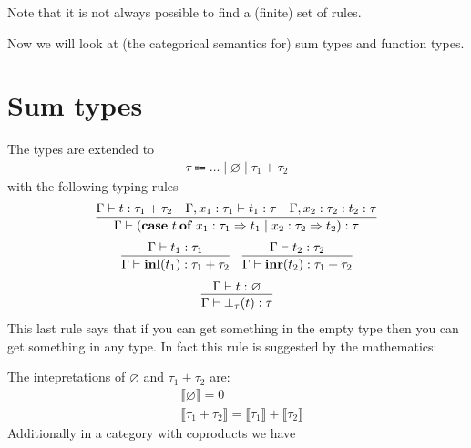 Note that it is not always possible to find a (finite) set of rules.

Now we will look at (the categorical semantics for) sum types and function types.

\section{Sum types}

The types are extended to
\begin{align*}
    \tau \Coloneqq \ldots \mid \varnothing \mid \tau_1 + \tau_2
\end{align*}
with the following typing rules
\begin{align*}
    \infer{\Gamma \vdash (\eqncode{case}\ t \eqncode{of} x_1 : \tau_1 \Rightarrow
    t_1 \mid x_2 : \tau_2 \Rightarrow t_2) : \tau}
    {\Gamma \vdash t : \tau_1 + \tau_2 & \Gamma, x_1 : \tau_1 \vdash t_1 : \tau
    & \Gamma, x_2 : \tau_2 : t_2 : \tau}
\end{align*}
\begin{align*}
    \infer{\Gamma \vdash \eqncode{inl}(t_1) : \tau_1 + \tau_2}
    {\Gamma \vdash t_1 : \tau_1}
    &&
    \infer{\Gamma \vdash \eqncode{inr}(t_2) : \tau_1 + \tau_2}
    {\Gamma \vdash t_2 : \tau_2}
\end{align*}
\begin{align*}
    \infer{\Gamma \vdash \bot_\tau(t) : \tau}
    {\Gamma \vdash t : \varnothing}
\end{align*}
This last rule says that if you can get something in the empty type then you can
get something in any type. In fact this rule is suggested by the mathematics:
\begin{center}
\end{center}
The intepretations of $\varnothing$ and $\tau_1 + \tau_2$ are:
\begin{align*}
    &\llbracket \varnothing \rrbracket = 0
    \\
    &\llbracket \tau_1 + \tau_2 \rrbracket = \llbracket \tau_1 \rrbracket +
    \llbracket \tau_2 \rrbracket
\end{align*}
Additionally in a category with coproducts we have
\begin{center}
\end{center}


